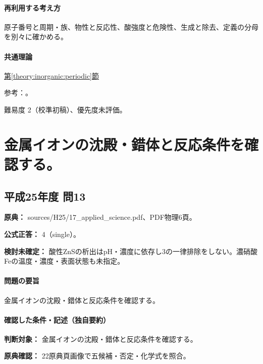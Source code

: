 \paragraph{再利用する考え方} 原子番号と周期・族、物性と反応性、酸強度と危険性、生成と除去、定義の分母を別々に確かめる。

\paragraph{共通理論} \hyperref[theory:inorganic:periodic]{第\ref*{theory:inorganic:periodic}節}

\par 参考：\cite{atomic_nist2019}。

\par 難易度 2（校準初稿）、優先度未評価。

\section{金属イオンの沈殿・錯体と反応条件を確認する。}

\subsection{平成25年度 問13}
\label{q:h25-reg-applied-13}

\noindent\textbf{原典：} sources/H25/17\_applied\_science.pdf、PDF物理6頁。

\textbf{公式正答：} 4（single）。

\par\textbf{検討未確定：} 酸性ZnSの析出はpH・濃度に依存し3の一律排除をしない。濃硝酸Feの温度・濃度・表面状態も未指定。

\paragraph{問題の要旨} 金属イオンの沈殿・錯体と反応条件を確認する。

\paragraph{確認した条件・記述（独自要約）}\mbox{}\par

\noindent\textbf{判断対象：} 金属イオンの沈殿・錯体と反応条件を確認する。\par

\noindent\textbf{原典確認：} 22原典頁画像で五候補・否定・化学式を照合。\par

